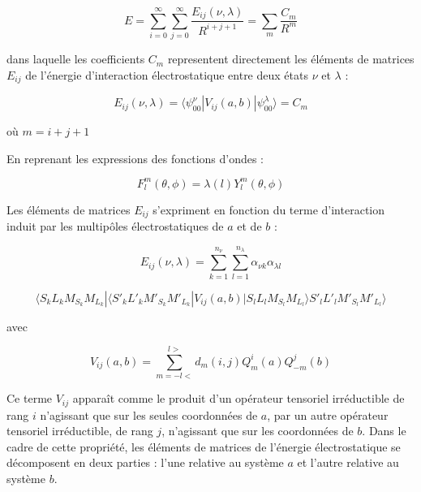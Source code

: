 	\begin{equation}
	E = \sum_{i=0}^{\infty} \sum_{j=0}^{\infty} \frac{E_{ij} (\nu,\lambda)}{R^{i+j+1}} = \sum_{m} \frac{C_{m}}{R^{m}}
	\end{equation}
	
	dans laquelle les coefficients $C_{m}$ representent directement les éléments de matrices $E_{ij}$ de l'énergie d'interaction électrostatique entre deux états $\nu$ et $\lambda$ : 
	
	\begin{equation}
	E_{ij}(\nu, \lambda) = \langle \psi_{00}^{\nu}|V_{ij}(a,b)|\psi_{00}^{\lambda} \rangle = C_{m}
	\end{equation}
	
	où $m= i+j+1$ 
	
	En reprenant les expressions des fonctions d'ondes :
	
	\begin{equation}
	F_{l}^{m} (\theta,\phi) = \lambda (l)Y_{l}^{m} (\theta,\phi)
	\end{equation}
	
	Les éléments de matrices $E_{ij}$ s'expriment en fonction du terme d'interaction induit par les multipôles électrostatiques de $a$ et de $b$ : 
	
	\begin{equation*}
	E_{ij} (\nu , \lambda) = \sum_{k=1}^{n_{\nu}} \sum_{l=1}^{n_{\lambda}} \alpha_{\nu k} \alpha_{\lambda l}
	\end{equation*}
	
	\begin{equation}
	\langle S_{k}L_{k}M_{S_{k}}M_{L_{k}}|\langle S'_{k}L'_{k}M'_{S_{k}}M'_{L_{k}}| V_{ij}(a,b)| S_{l}L_{l}M_{S_{l}} M_{L_{l}} \rangle S'_{l}L'_{l}M'_{S_{l}}M'_{L_{l}} \rangle
	\end{equation}
	
	avec 
	
	\begin{equation}
	V_{ij}(a,b) = \sum_{m=-l<}^{l>} d_{m}(i,j) Q_{m}^{i}(a) Q_{-m}^{j}(b) 
	\end{equation}
	
	
	Ce terme $V_{ij}$ apparaît comme le produit d'un opérateur tensoriel irréductible de rang $i$ n'agissant que sur les seules coordonnées de $a$, par un autre opérateur tensoriel irréductible, de rang $j$, n'agissant que sur les coordonnées de $b$. Dans le cadre de cette propriété, les éléments de matrices de l'énergie électrostatique se décomposent en deux parties : l'une relative au système $a$ et l'autre relative au système $b$. 
	
